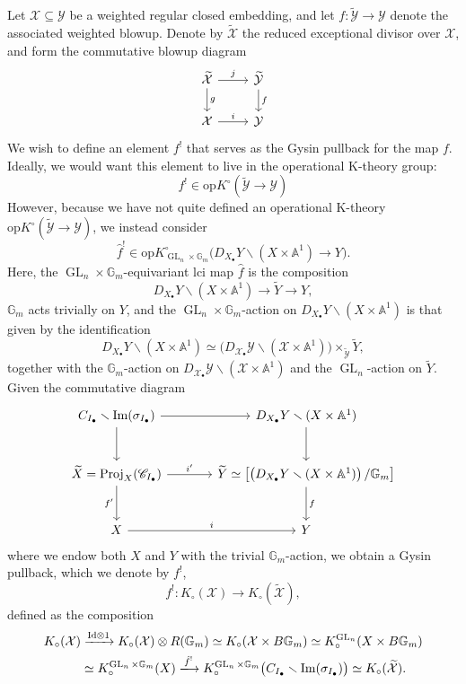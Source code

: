 \documentclass[12pt]{amsart}
\newcommand\Gm{\mathbb{G}_m}
\newcommand\Proj{\text{Proj}}
\newcommand{\bA}{\mathbb{A}}
\newcommand{\sC}{\mathscr{C}}
\newcommand{\cX}{\mathcal{X}}
\newcommand{\cY}{\mathcal{Y}}
\newcommand{\tcY}{\widetilde{\mathcal{Y}}}
\newcommand{\tcX}{\widetilde{\mathcal{X}}}
\newcommand{\GL}{\operatorname{GL}}
\newcommand{\Kgroup}{K_{\circ}}
\newcommand{\opK}{\mathrm{op}K^{\circ}}
\theoremstyle{definition}
\begin{document}
Let $\cX \subseteq \cY$ be a weighted regular closed embedding, and let $f: \widetilde{\cY} \to \cY$ denote the associated weighted blowup. Denote by $\tcX$ the reduced exceptional divisor over $\cX$, and form the commutative blowup diagram
\[
\begin{tikzcd}
    \tcX\arrow[r,"j"]\arrow[d,"g"] & \tcY\arrow[d,"f"]\\
    \cX\arrow[r,"i"] & \cY
\end{tikzcd}
\]
We wish to define an element $f^!$ that serves as the Gysin pullback for the map $f$. Ideally, we would want this element to live in the operational K-theory group:
\[
    f^! \in \opK(\widetilde{\cY} \to \cY)
\]
However, because we have not quite defined an operational K-theory $\opK(\widetilde{\cY} \to \cY)$, we instead consider
\[
\hat{f}^! \in \opK_{\GL_n \times \Gm}\bigl(D_{X_\bullet}Y \smallsetminus (X \times \bA^1) \to Y\bigr).
\]
Here, the $\GL_n \times \Gm$-equivariant lci map $\hat{f}$ is the composition 
$$
D_{X_\bullet}Y \smallsetminus (X \times \bA^1) \longrightarrow \widetilde{Y} \longrightarrow Y,
$$
$\Gm$ acts trivially on $Y$, and the $\GL_n \times \Gm$-action on 
$D_{X_\bullet}Y \smallsetminus (X \times \bA^1)$ is that given by the identification
\begin{equation}\label{eqn: GmXGLn-action-def-normal-cone}
D_{X_\bullet}Y \smallsetminus (X \times \bA^1) 
\simeq 
\bigl( D_{\cX_\bullet}\cY \smallsetminus (\cX \times \bA^1) \bigr) 
\times_{\widetilde{\cY}} \widetilde{Y},
\end{equation}
together with the $\Gm$-action on 
$D_{\cX_\bullet}\cY \smallsetminus (\cX \times \bA^1)$ and the $\GL_n$-action on $\widetilde{Y}$.
Given the commutative diagram
\begin{equation}\label{eqn: diagram cone}
\begin{tikzcd}[row sep=large, column sep=large]
C_{I_{\bullet}} \smallsetminus \operatorname{Im}(\sigma_{I_{\bullet}})
\arrow[r] \arrow[d] 
& D_{X_\bullet}Y \smallsetminus (X \times \bA^1) \arrow[d] \\
\widetilde{X}= \Proj_{X}(\sC_{I_{\bullet}})
\arrow[r, "i'"] \arrow[d, "f'"'] 
& \widetilde{Y} \simeq \left[\left( D_{X_\bullet}Y \smallsetminus (X \times \bA^1)\right)/\Gm\right] 
\arrow[d, "f"] \\
X \arrow[r, "i"] & Y
\end{tikzcd}
\end{equation}
where we endow both $X$ and $Y$ with the trivial $\Gm$-action, we obtain a Gysin pullback, which we denote by $f^!$,
\[
f^! : \Kgroup(\cX) \longrightarrow \Kgroup(\widetilde{\cX}),
\]
defined as the composition
\[
\begin{aligned}
\Kgroup(\cX) 
&\xrightarrow{\mathrm{Id} \otimes 1} 
\Kgroup(\cX) \otimes R(\Gm)
\simeq \Kgroup(\cX \times B\Gm)
\simeq \Kgroup^{\GL_n}(X \times B\Gm) \\
&\simeq \Kgroup^{\GL_n \times \Gm}(X)
\xlongrightarrow{\hat{f}^!} 
\Kgroup^{\GL_n \times \Gm}\bigl(C_{I_{\bullet}} \smallsetminus \operatorname{Im}(\sigma_{I_{\bullet}})\bigr)
\simeq \Kgroup(\widetilde{\cX}).
\end{aligned}
\]
\end{document}

